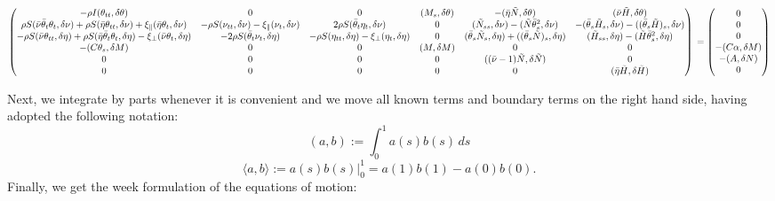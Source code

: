 \[\begin{pmatrix}
-\rho I (\theta_{tt},\delta\theta) & 0 & 0 & (M_s,\delta\theta) & -(\bar{\eta}\tilde{N},\delta\theta) & (\bar{\nu}\tilde{H},\delta\theta) 
\\
\rho S(\bar{\nu}\bar{\theta}_t\theta_t,\delta\nu) + \rho S (\bar{\eta}\theta_{tt},\delta\nu) + \xi_{\parallel}(\bar{\eta}\theta_t,\delta\nu) & -\rho S (\nu_{tt},\delta\nu) -\xi_{\parallel}(\nu_t,\delta\nu) & 2 \rho S(\bar{\theta}_t\eta_t,\delta\nu) & 0 & (\tilde{N}_{ss},\delta\nu) - (\tilde{N}\bar{\theta}_s^2,\delta\nu) & -(\bar{\theta}_s \tilde{H}_s,\delta\nu) - ((\bar{\theta}_s \tilde{H})_s,\delta\nu) 
\\
-\rho S (\bar{\nu}\theta_{tt},\delta\eta) + \rho S (\bar{\eta}\bar{\theta}_t\theta_t,\delta\eta) - \xi_{\perp}(\bar{\nu}\theta_t,\delta\eta) & - 2\rho S (\bar{\theta}_t \nu_t,\delta\eta) & -\rho S (\eta_{tt},\delta\eta) - \xi_{\perp}(\eta_t,\delta\eta) & 0 & (\bar{\theta}_s \tilde{N}_s, \delta\eta) + ((\bar{\theta}_s \tilde{N})_s,\delta\eta) & (\tilde{H}_{ss},\delta\eta) - (\tilde{H}\bar{\theta}_s^2,\delta\eta) 
\\
-(C\theta_s,\delta M) & 0 & 0 & (M, \delta M) & 0 & 0 
\\
0 & 0 & 0 & 0 & ((\bar{\nu}-1)\tilde{N}, \delta\tilde{N}) & 0 
\\
0 & 0 & 0 & 0 & 0 & (\bar{\eta}\tilde{H}, \delta \tilde{H}) 
\end{pmatrix}
\\ =
\begin{pmatrix}
0\\
0\\
0\\
-(C\alpha,\delta M) \\
-(A,\delta N) \\
0
\end{pmatrix}\]

Next, we integrate by parts whenever it is convenient and we move all known terms and boundary terms on the right hand side, having adopted the following notation:
\[
(a,b) := \int_0^1 a(s) b(s) \, ds
\]
\[
\langle a,b \rangle := a(s) b(s) \big|^1_0 = a(1)b(1)-a(0)b(0).
\]
Finally, we get the week formulation of the equations of motion:

